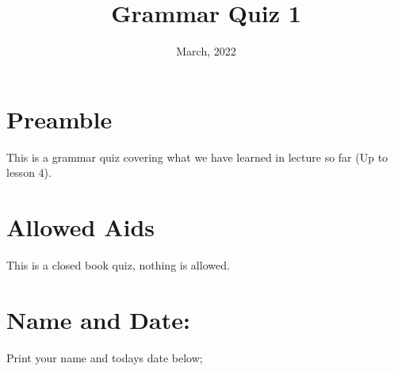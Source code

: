 \documentclass[12pt]{article} %
\title{Grammar Quiz 1}
\date{March, 2022}
\begin{document}
    \renewcommand*{\coursecode}{MCR3U Quiz} %
    \renewcommand*{\assgnnumber}{2} %
    \renewcommand*{\submdate}{January, 2022} %
    \renewcommand*{\studentfname}{\textbf{Name:}} %
    \renewcommand*{\studentlname}{} %

    \renewcommand\qedsymbol{$\blacksquare$}
    \setfigpath
    \pagestyle{crowdmark}
    \fancyhfoffset[L,O]{0pt} %




	\maketitle
	\section{Preamble}
  This is a grammar quiz covering what we have learned in lecture so far (Up to lesson 4).
	\section{Allowed Aids}
  This is a closed book quiz, nothing is allowed.
	\section{Name and Date:}
	Print your name and todays date below;
\end{document}
